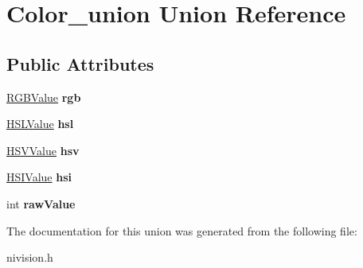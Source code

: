 \hypertarget{unionColor__union}{
\section{Color\_\-union Union Reference}
\label{unionColor__union}
}
\subsection*{Public Attributes}
\begin{DoxyCompactItemize}
\item 
\hypertarget{unionColor__union_a54f243f61bb7d264b2cc54525382596a}{
\hyperlink{structRGBValue__struct}{RGBValue} {\bfseries rgb}}
\label{unionColor__union_a54f243f61bb7d264b2cc54525382596a}

\item 
\hypertarget{unionColor__union_a7a6ddfcb30fa0cfed8be5581f1cb4d1d}{
\hyperlink{structHSLValue__struct}{HSLValue} {\bfseries hsl}}
\label{unionColor__union_a7a6ddfcb30fa0cfed8be5581f1cb4d1d}

\item 
\hypertarget{unionColor__union_ac908719b3193966e15169b9741955297}{
\hyperlink{structHSVValue__struct}{HSVValue} {\bfseries hsv}}
\label{unionColor__union_ac908719b3193966e15169b9741955297}

\item 
\hypertarget{unionColor__union_a5f95361ea1dee5fc560beb69301da4bc}{
\hyperlink{structHSIValue__struct}{HSIValue} {\bfseries hsi}}
\label{unionColor__union_a5f95361ea1dee5fc560beb69301da4bc}

\item 
\hypertarget{unionColor__union_ade3dc846117f40337c130bed0aec6811}{
int {\bfseries rawValue}}
\label{unionColor__union_ade3dc846117f40337c130bed0aec6811}

\end{DoxyCompactItemize}


The documentation for this union was generated from the following file:\begin{DoxyCompactItemize}
\item 
nivision.h\end{DoxyCompactItemize}
